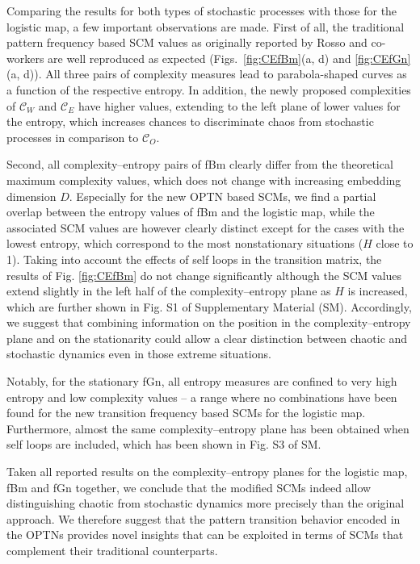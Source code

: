 \documentclass[aip,cha,reprint,nofootinbib]{revtex4-1}
\begin{document}
Comparing the results for both types of stochastic processes with those for the logistic map, a few important observations are made. First of all, the traditional pattern frequency based SCM values as originally reported by Rosso and co-workers \cite{RossoPRE2007,rossoPRL2007} are well reproduced as expected (Figs.~\ref{fig:CEfBm}(a, d) and \ref{fig:CEfGn}(a, d)). {\color{red}All three pairs of complexity measures lead to parabola-shaped curves as a function of the respective entropy. In addition, the newly proposed complexities of $\mathcal{C}_{W}$ and $\mathcal{C}_{E}$ have higher values, extending to the left plane of lower values for the entropy, which increases chances to discriminate chaos from stochastic processes in comparison to $\mathcal{C}_O$. } 

Second, all complexity--entropy pairs of fBm clearly differ from the theoretical maximum complexity values, which does not change with increasing embedding dimension $D$. Especially for the new OPTN based SCMs, we find a partial overlap between the entropy values of fBm and the logistic map, while the associated SCM values are however clearly distinct except for the cases with the lowest entropy, which correspond to the most nonstationary situations ($H$ close to 1). {\color{red}Taking into account the effects of self loops in the transition matrix, the results of Fig. \ref{fig:CEfBm} do not change significantly although the SCM values extend slightly in the left half of the complexity--entropy plane as $H$ is increased, which are further shown in Fig. S1 of Supplementary Material (SM).} Accordingly, we suggest that combining information on the position in the complexity--entropy plane and on the stationarity could allow a clear distinction between chaotic and stochastic dynamics even in those extreme situations. 

Notably, for the stationary fGn, all entropy measures are confined to very high entropy and low complexity values -- a range where no combinations have been found for the new transition frequency based SCMs for the logistic map. {\color{red}Furthermore, almost the same complexity--entropy plane has been obtained when self loops are included, which has been shown in Fig. S3 of SM. }

Taken all reported results on the complexity--entropy planes for the logistic map, fBm and fGn together, we conclude that the modified SCMs indeed allow distinguishing chaotic from stochastic dynamics more precisely than the original approach. We therefore suggest that the pattern transition behavior encoded in the OPTNs provides novel insights that can be exploited in terms of SCMs that complement their traditional counterparts. 
\end{document}
